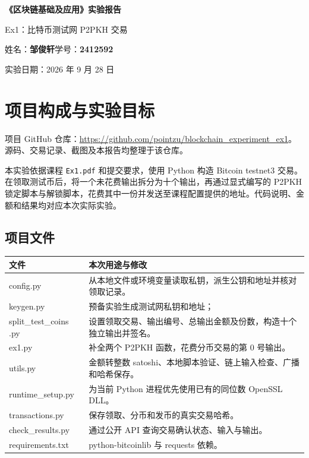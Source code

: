 \documentclass[UTF8,a4paper,11pt,fontset=windows]{ctexart}
\begin{document}
\begin{center}
{\LARGE\bfseries《区块链基础及应用》实验报告\par}
\vspace{5mm}
{\Large Ex1：比特币测试网 P2PKH 交易\par}
\vspace{5mm}
姓名：\textbf{邹俊轩}\qquad 学号：\textbf{2412592}\par
实验日期：2026 年 9 月 28 日
\end{center}
\vspace{3mm}
\section{项目构成与实验目标}
项目 GitHub 仓库：\url{https://github.com/pointzu/blockchain_experiment_ex1}。源码、交易记录、截图及本报告均整理于该仓库。\par
本实验依据课程 \texttt{Ex1.pdf} 和提交要求，使用 Python 构造 Bitcoin testnet3 交易。在领取测试币后，将一个未花费输出拆分为十个输出，再通过显式编写的 P2PKH 锁定脚本与解锁脚本，花费其中一份并发送至课程配置提供的地址。代码说明、金额和结果均对应本次实际实验。
\subsection{项目文件}
\par\noindent\begin{tabularx}{\linewidth}{@{}>{\ttfamily\small}l X@{}}
\toprule 文件 & 本次用途与修改 \\
\midrule
config.py & 从本地文件或环境变量读取私钥，派生公钥和地址并核对领取记录。\\
keygen.py & 预备实验生成测试网私钥和地址；\\
split\_test\_coins .py & 设置领取交易、输出编号、总输出金额及份数，构造十个独立输出并签名。\\
ex1.py & 补全两个 P2PKH 函数，花费分币交易的第 0 号输出。\\
utils.py & 金额转整数 satoshi、本地脚本验证、链上输入检查、广播和哈希保存。\\
runtime\_setup.py & 为当前 Python 进程优先使用已有的同位数 OpenSSL DLL。\\
transactions.py & 保存领取、分币和发币的真实交易哈希。\\
check\_results.py & 通过公开 API 查询交易确认状态、输入与输出。\\
requirements.txt & python-bitcoinlib 与 requests 依赖。\\
\bottomrule
\end{tabularx}
\end{document}
